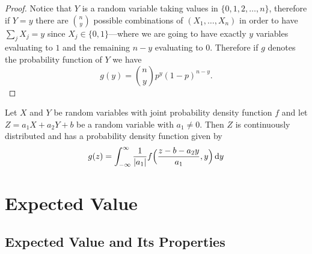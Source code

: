 \begin{proof}
    Notice that \(Y\) is a random variable taking values in
    \(\{0, 1, 2, \dots, n\}\), therefore if \(Y = y\) there are \(\binom{n}{y}\)
    possible combinations of \((X_1, \dots, X_n)\) in order to have
    \(\sum_j X_j = y\) since \(X_j \in \{0, 1\}\)---where we are going to have
    exactly \(y\) variables evaluating to \(1\) and the remaining \(n - y\)
    evaluating to \(0\). Therefore if \(g\) denotes the probability function of
    \(Y\) we have
    \[
        g(y) = \binom{n}{y} p^y (1 - p)^{n - y}.
    \]
\end{proof}

\begin{proposition}
    \label{prop:}
    Let \(X\) and \(Y\) be random variables with joint probability density function
    \(f\) and let \(Z = a_1 X + a_2 Y + b\) be a random variable with \(a_1 \neq
    0\). Then \(Z\) is continuously distributed and has a probability density
    function given by
    \[
        g(z) = \int_{-\infty}^{\infty} \frac{1}{|a_1|}
        f\Big( \frac{z - b - a_{2}y}{a_1}, y \Big)\, \mathrm{d} y
    \]
\end{proposition}

\section{Expected Value}

\subsection{Expected Value and Its Properties}

